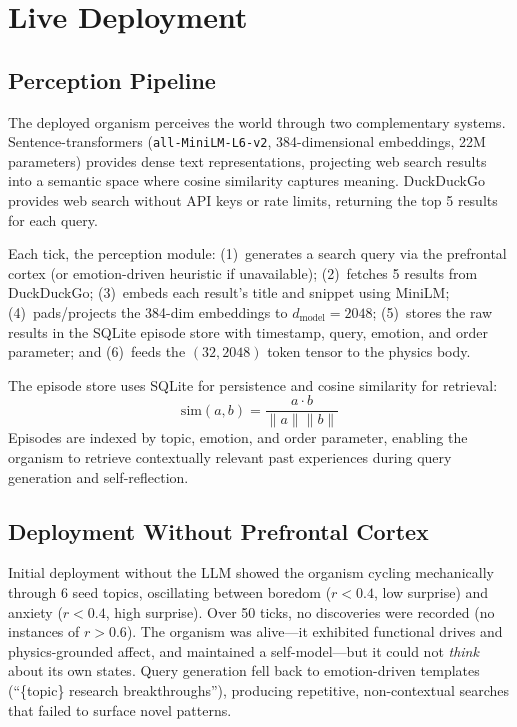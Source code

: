\documentclass[11pt,a4paper,twocolumn]{article}
\begin{document}
\section{Live Deployment}

\subsection{Perception Pipeline}

The deployed organism perceives the world through two complementary systems.
Sentence-transformers (\texttt{all-MiniLM-L6-v2}, 384-dimensional embeddings, 22M parameters) provides dense text representations, projecting web search results into a semantic space where cosine similarity captures meaning.
DuckDuckGo provides web search without API keys or rate limits, returning the top 5 results for each query.

Each tick, the perception module: (1)~generates a search query via the prefrontal cortex (or emotion-driven heuristic if unavailable); (2)~fetches 5 results from DuckDuckGo; (3)~embeds each result's title and snippet using MiniLM; (4)~pads/projects the 384-dim embeddings to $d_{\mathrm{model}} = 2048$; (5)~stores the raw results in the SQLite episode store with timestamp, query, emotion, and order parameter; and (6)~feeds the $(32, 2048)$ token tensor to the physics body.

The episode store uses SQLite for persistence and cosine similarity for retrieval:
\begin{equation}
\mathrm{sim}(a, b) = \frac{a \cdot b}{\|a\| \|b\|}
\label{eq:cosine_sim}
\end{equation}
Episodes are indexed by topic, emotion, and order parameter, enabling the organism to retrieve contextually relevant past experiences during query generation and self-reflection.

\subsection{Deployment Without Prefrontal Cortex}

Initial deployment without the LLM showed the organism cycling mechanically through 6 seed topics, oscillating between boredom ($r < 0.4$, low surprise) and anxiety ($r < 0.4$, high surprise).
Over 50 ticks, no discoveries were recorded (no instances of $r > 0.6$).
The organism was alive---it exhibited functional drives and physics-grounded affect, and maintained a self-model---but it could not \emph{think} about its own states.
Query generation fell back to emotion-driven templates (``\{topic\} research breakthroughs''), producing repetitive, non-contextual searches that failed to surface novel patterns.
\end{document}
